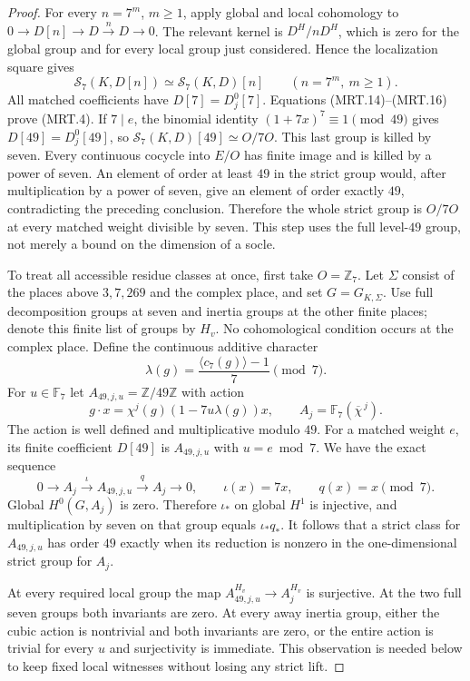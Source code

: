 \begin{proof}
For every $n=7^m$, $m\geq1$, apply global and local cohomology to
$0\to D[n]\to D\xrightarrow{n}D\to0$.  The relevant kernel is
$D^{H}/nD^{H}$, which is zero for the global group and for every
local group just considered.  Hence the localization square gives
\[
             \mathcal S_7(K,D[n])\simeq\mathcal S_7(K,D)[n]
                       \qquad(n=7^m,\ m\geq1).                         \tag{MRT.16}
\]
All matched coefficients have $D[7]=D_j^0[7]$.  Equations
(MRT.14)--(MRT.16) prove (MRT.4).  If $7\mid e$, the binomial
identity $(1+7x)^7\equiv1\pmod{49}$ gives
$D[49]=D_j^0[49]$, so $\mathcal S_7(K,D)[49]\simeq O/7O$.
This last group is killed by seven.  Every continuous cocycle into
$E/O$ has finite image and is killed by a power of seven.  An
element of order at least $49$ in the strict group would, after
multiplication by a power of seven, give an element of order exactly
$49$, contradicting the preceding conclusion.  Therefore the
whole strict group is $O/7O$ at every matched weight divisible by
seven.  This step uses the full level-$49$ group, not merely a
bound on the dimension of a socle.

To treat all accessible residue classes at once, first take
$O=\mathbb Z_7$.  Let $\Sigma$ consist of the places above
$3,7,269$ and the complex place, and set $G=G_{K,\Sigma}$.
Use full decomposition groups at seven and inertia groups at
the other finite places; denote this finite list of groups by $H_v$.
No cohomological condition occurs at the complex place.
Define the continuous additive character
\[
 \lambda(g)=\frac{\langle c_7(g)\rangle-1}{7}\pmod7.
 \tag{MRT.17}
\]
For $u\in\mathbb F_7$ let $A_{49,j,u}=\mathbb Z/49\mathbb Z$
with action
\[
       g\cdot x=\chi^j(g)(1-7u\lambda(g))x,
       \qquad A_j=\mathbb F_7(\overline\chi^{\,j}).             \tag{MRT.18}
\]
The action is well defined and multiplicative modulo $49$.
For a matched weight $e$, its finite coefficient $D[49]$ is
$A_{49,j,u}$ with $u=e\bmod7$.  We have the exact sequence
\[
 0\longrightarrow A_j\xrightarrow{\iota} A_{49,j,u}
       \xrightarrow{q} A_j\longrightarrow0,
       \qquad \iota(x)=7x,\qquad q(x)=x\pmod7.                \tag{MRT.19}
\]
Global $H^0(G,A_j)$ is zero.  Therefore $\iota_*$ on global
$H^1$ is injective, and multiplication by seven on that group
equals $\iota_*q_*$.  It follows that a strict class for
$A_{49,j,u}$ has order $49$ exactly when its reduction is nonzero
in the one-dimensional strict group for $A_j$.

At every required local group the map
$A_{49,j,u}^{H_v}\to A_j^{H_v}$ is surjective.  At the two full
seven groups both invariants are zero.  At every away inertia
group, either the cubic action is nontrivial and both invariants
are zero, or the entire action is trivial for every $u$ and
surjectivity is immediate.  This observation is needed below
to keep fixed local witnesses without losing any strict lift.


\end{proof}
